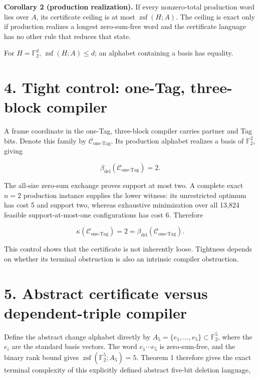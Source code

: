 \documentclass[
  11pt,
]{article}
\begin{document}
\textbf{Corollary 2 (production realization).} If every nonzero-total
production word lies over \(A\), its certificate ceiling is at most
\(\operatorname{zsf}(H; A)\). The ceiling is exact only if production
realizes a longest zero-sum-free word and the certificate language has
no other rule that reduces that state.

For \(H=\mathbb F_2^d\), \(\operatorname{zsf}(H; A)\le d\); an alphabet
containing a basis has equality.

\hypertarget{tight-control-one-tag-three-block-compiler}{%
\section{4. Tight control: one-Tag, three-block
compiler}\label{tight-control-one-tag-three-block-compiler}}

A frame coordinate in the one-Tag, three-block compiler carries partner
and Tag bits. Denote this family by
\(\mathcal C_{\mathrm{one\text{-}Tag}}\). Its production alphabet
realizes a basis of \(\mathbb F_2^2\), giving

\[
\beta_{\mathrm{del}}(\mathcal C_{\mathrm{one\text{-}Tag}})=2.
\]

The all-size zero-sum exchange proves support at most two. A complete
exact \(n=2\) production instance supplies the lower witness: its
unrestricted optimum has cost 5 and support two, whereas exhaustive
minimization over all 13,824 feasible support-at-most-one configurations
has cost 6. Therefore

\[
\kappa(\mathcal C_{\mathrm{one\text{-}Tag}})=2
=\beta_{\mathrm{del}}(\mathcal C_{\mathrm{one\text{-}Tag}}).
\]

This control shows that the certificate is not inherently loose.
Tightness depends on whether its terminal obstruction is also an
intrinsic compiler obstruction.

\hypertarget{abstract-certificate-versus-dependent-triple-compiler}{%
\section{5. Abstract certificate versus dependent-triple
compiler}\label{abstract-certificate-versus-dependent-triple-compiler}}

Define the abstract change alphabet directly by
\(A_5=\{e_1,\ldots,e_5\}\subset\mathbb F_2^5\), where the \(e_i\) are
the standard basis vectors. The word \(e_1\cdots e_5\) is zero-sum-free,
and the binary rank bound gives
\(\operatorname{zsf}(\mathbb F_2^5;A_5)=5\). Theorem 1 therefore gives
the exact terminal complexity of this explicitly defined abstract
five-bit deletion language,
\end{document}
